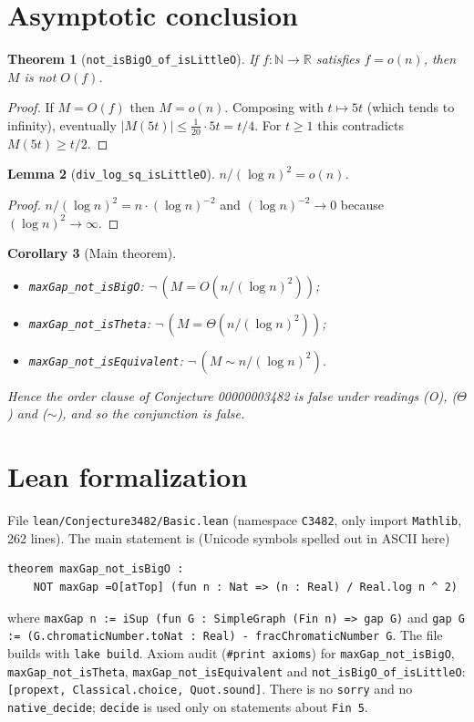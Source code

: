 \documentclass[11pt]{article}
\newtheorem{theorem}{Theorem}
\newtheorem{lemma}[theorem]{Lemma}
\newtheorem{corollary}[theorem]{Corollary}
\theoremstyle{definition}
\theoremstyle{remark}
\begin{document}
\section{Asymptotic conclusion}

\begin{theorem}[\texttt{not\_isBigO\_of\_isLittleO}]
If $f:\mathbb{N}\to\mathbb{R}$ satisfies $f=o(n)$, then $M$ is not $O(f)$.
\end{theorem}
\begin{proof}
If $M=O(f)$ then $M=o(n)$. Composing with $t\mapsto 5t$ (which tends to infinity), eventually
$|M(5t)|\le\frac1{20}\cdot 5t=t/4$. For $t\ge1$ this contradicts $M(5t)\ge t/2$.
\end{proof}

\begin{lemma}[\texttt{div\_log\_sq\_isLittleO}]
$n/(\log n)^2=o(n)$.
\end{lemma}
\begin{proof}
$n/(\log n)^2=n\cdot(\log n)^{-2}$ and $(\log n)^{-2}\to0$ because $(\log n)^2\to\infty$.
\end{proof}

\begin{corollary}[Main theorem]
\leavevmode
\begin{itemize}
  \item \texttt{maxGap\_not\_isBigO}: $\neg\,(M=O(n/(\log n)^2))$;
  \item \texttt{maxGap\_not\_isTheta}: $\neg\,(M=\Theta(n/(\log n)^2))$;
  \item \texttt{maxGap\_not\_isEquivalent}: $\neg\,(M\sim n/(\log n)^2)$.
\end{itemize}
Hence the order clause of Conjecture 00000003482 is false under readings (O), ($\Theta$) and
($\sim$), and so the conjunction is false.
\end{corollary}

\section{Lean formalization}

File \texttt{lean/Conjecture3482/Basic.lean} (namespace \texttt{C3482}, only import
\texttt{Mathlib}, 262 lines). The main statement is (Unicode symbols spelled out in ASCII here)
\begin{verbatim}
theorem maxGap_not_isBigO :
    NOT maxGap =O[atTop] (fun n : Nat => (n : Real) / Real.log n ^ 2)
\end{verbatim}
where \texttt{maxGap n := iSup (fun G : SimpleGraph (Fin n) => gap G)} and
\texttt{gap G := (G.chromaticNumber.toNat : Real) - fracChromaticNumber G}. The file builds with
\texttt{lake build}. Axiom audit (\texttt{\#print axioms}) for \texttt{maxGap\_not\_isBigO},
\texttt{maxGap\_not\_isTheta}, \texttt{maxGap\_not\_isEquivalent} and
\texttt{not\_isBigO\_of\_isLittleO}: \texttt{[propext, Classical.choice, Quot.sound]}. There is no
\texttt{sorry} and no \texttt{native\_decide}; \texttt{decide} is used only on statements about
\texttt{Fin 5}.
\end{document}
